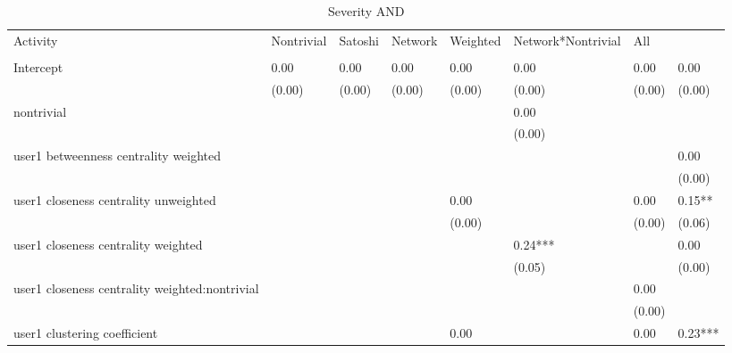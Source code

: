 \begin{table*}
\caption{Severity AND}
\begin{center}
\begin{tabular}{llllllll}
\hline
Activity 									                    & Nontrivial& Satoshi    & Network & Weighted & Network*Nontrivial		      &  All    \\
\\
\hline
\hline
Intercept                                      & 0.00     & 0.00       & 0.00    & 0.00    & 0.00     & 0.00               & 0.00     \\
                                               & (0.00)   & (0.00)     & (0.00)  & (0.00)  & (0.00)   & (0.00)             & (0.00)   \\
nontrivial                                     &          &            &         &         & 0.00     &                    &          \\
                                               &          &            &         &         & (0.00)   &                    &          \\
user1 betweenness centrality weighted          &          &            &         &         &          &                    & 0.00     \\
                                               &          &            &         &         &          &                    & (0.00)   \\
user1 closeness centrality unweighted          &          &            &         & 0.00    &          & 0.00               & 0.15**   \\
                                               &          &            &         & (0.00)  &          & (0.00)             & (0.06)   \\
user1 closeness centrality weighted            &          &            &         &         & 0.24***  &                    & 0.00     \\
                                               &          &            &         &         & (0.05)   &                    & (0.00)   \\
user1 closeness centrality weighted:nontrivial &          &            &         &         &          & 0.00               &          \\
                                               &          &            &         &         &          & (0.00)             &          \\
user1 clustering coefficient                   &          &            &         & 0.00    &          & 0.00               & 0.23***  \\

\end{tabular}
\end{center}
\end{table*}
